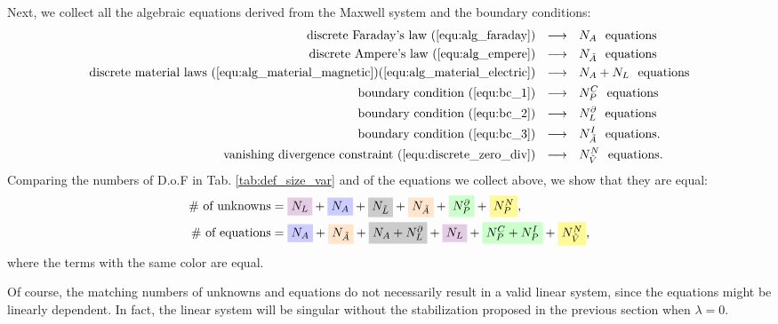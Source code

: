\documentclass{article}
\begin{document}
Next, we collect all the algebraic equations derived from the Maxwell system and the boundary conditions: 
\begin{align*}
    \text{discrete Faraday's law (\ref{equ:alg_faraday})} \ \ &\longrightarrow\ \  N_A \ \ \text{equations} \\
    \text{discrete Ampere's law (\ref{equ:alg_empere})} \ \ &\longrightarrow\ \  N_{\Tilde{A}} \ \ \text{equations} \\
    \text{discrete material laws (\ref{equ:alg_material_magnetic})(\ref{equ:alg_material_electric})} \ \ &\longrightarrow\ \  N_A + N_L \ \ \text{equations} \\
    \text{boundary condition (\ref{equ:bc_1})} \ \ &\longrightarrow\ \  N_P^C \ \ \text{equations} \\
    \text{boundary condition (\ref{equ:bc_2})} \ \ &\longrightarrow\ \  N_L^\partial \ \ \text{equations} \\
    \text{boundary condition (\ref{equ:bc_3})} \ \ &\longrightarrow\ \  N_{\Tilde{A}}^I \ \ \text{equations}. \\
    \text{vanishing divergence constraint (\ref{equ:discrete_zero_div})} \ \ &\longrightarrow\ \  N_{\Tilde{V}}^{N} \ \ \text{equations}. \\
\end{align*}
Comparing the numbers of D.o.F in Tab. \ref{tab:def_size_var} and of the equations we collect above, we show that they are equal:
\begin{align*}
    \#\text{ of unknowns} &= \colorbox{violet!20}{$N_L$} + \colorbox{blue!20}{$N_A$} + \colorbox{gray!40}{$N_{\Tilde{L}}$} + \colorbox{orange!20}{$N_{\Tilde{A}}$} + \colorbox{green!20}{$N_P^\partial$} + \colorbox{yellow!40}{$N_P^{N}$}, \\
    \#\text{ of equations} &= \colorbox{blue!20}{$N_A$} + \colorbox{orange!20}{$N_{\Tilde{A}}$} + \colorbox{gray!40}{$N_A+N_L^\partial$} + \colorbox{violet!20}{$N_L$} + \colorbox{green!20}{$N_P^C + N_P^I$}+ \colorbox{yellow!40}{$N_{\Tilde{V}}^N$},
\end{align*}
where the terms with the same color are equal.

Of course, the matching numbers of unknowns and equations do not necessarily result in a valid linear system, since the equations might be linearly dependent. In fact, the linear system will be singular without the stabilization proposed in the previous section when $\lambda = 0$. 
\end{document}
